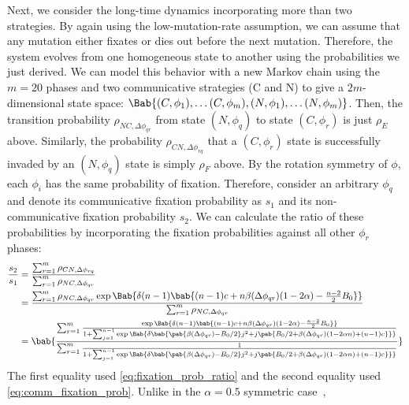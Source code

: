 \documentclass[pdflatex,sn-nature,super]{sn-jnl}
\begin{document}
Next, we consider the long-time dynamics incorporating more than two strategies.
By again using the low-mutation-rate assumption,
we can assume that any mutation either fixates
or dies out before the next mutation.
Therefore, the system evolves from one homogeneous state to another
using the probabilities we just derived.
We can model this behavior with a new Markov chain
using the $m=20$ phases and two communicative strategies (C and N)
to give a $2m$-dimensional state space:
$\Bab{(C,\phi_1), \ldots (C,\phi_m), (N,\phi_1), \ldots (N,\phi_m)}$.
Then, the transition probability $\rho_{NC,\Delta \phi_{qr}}$
from state $(N,\phi_q)$ to state $(C,\phi_r)$ is just $\rho_E$ above.
Similarly, the probability $\rho_{CN,\Delta \phi_{rq}}$
that a $(C,\phi_r)$ state is successfully invaded by
an $(N,\phi_q)$ state is simply $\rho_F$ above.
By the rotation symmetry of $\phi$, each $\phi_i$ has the same probability of fixation.
Therefore, consider an arbitrary $\phi_q$ and denote its communicative fixation probability as
$s_1$ and its non-communicative fixation probability $s_2$.
We can calculate the ratio of these probabilities
by incorporating the fixation probabilities against all other $\phi_r$ phases:
\begin{align}
  \frac{s_2}{s_1} &= \frac
    {\sum_{r=1}^{m} \rho_{CN,\Delta \phi_{rq}}}
    {\sum_{r=1}^{m} \rho_{NC,\Delta \phi_{qr}} }
  \\
  &=
  \frac
  {\sum_{r=1}^{m} \rho_{NC,\Delta \phi_{qr}}
    \exp \Bab{
      \delta (n-1)
      \bab{
        (n-1) c + n \beta(\Delta \phi_{qr}) (1 - 2 \alpha)
        - \frac{n-2}{2} B_0
      }
    }
  }
  {\sum_{r=1}^{m} \rho_{NC,\Delta \phi_{qr}}}
  \\
  &=
  \bab{
    \frac
    {\sum_{r=1}^{m} \frac
      {\exp \Bab{ \delta (n-1)
        \bab{
          (n-1) c + n \beta(\Delta \phi_{qr}) (1 - 2 \alpha) - \frac{n-2}{2} B_0
        }}
      }
      {1 + \sum_{j=1}^{n-1} \exp\Bab{
        \delta \bab{
         \pab{\beta(\Delta \phi_{qr}) - B_0/2} j^2
         + j \pab{B_0/2 + \beta(\Delta \phi_{qr}) (1 - 2 \alpha n) + (n-1) c}
        }}
      }
    }
    {\sum_{r=1}^{m} \frac{1}
      {1 + \sum_{j=1}^{n-1} \exp\Bab{
        \delta \bab{
         \pab{\beta(\Delta \phi_{qr}) - B_0/2} j^2
         + j \pab{B_0/2 + \beta(\Delta \phi_{qr}) (1 - 2 \alpha n) + (n-1) c}
        }}
      }
    }
  }
  \label{eq:full_analytic_frac}
\end{align}
The first equality used \cref{eq:fixation_prob_ratio}
and the second equality used \cref{eq:comm_fixation_prob}.
Unlike in the $\alpha = 0.5$ symmetric case~\citep{tripp2022evolutionary},
\end{document}
